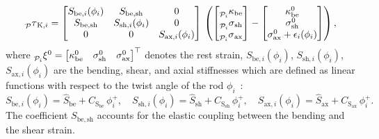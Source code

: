 \begin{equation}
    \prescript{}{\mathcal{P}}{\tau}_{\mathrm{K},i} = 
    \begin{bmatrix}
        S_{\mathrm{be},i}(\phi_i) & S_{\mathrm{be},\mathrm{sh}} & 0\\
        S_{\mathrm{be},\mathrm{sh}} & S_{\mathrm{sh},i}(\phi_i) & 0\\
        0 & 0 & S_{\mathrm{ax},i}(\phi_i)
    \end{bmatrix} 
    \, \left ( \begin{bmatrix}
        \prescript{}{\mathcal{P}_i}{\kappa}_\mathrm{be}\\ \prescript{}{\mathcal{P}_i}{\sigma}_\mathrm{sh}\\ \prescript{}{\mathcal{P}_i}{\sigma}_\mathrm{ax}
    \end{bmatrix} - \begin{bmatrix}
        \kappa_\mathrm{be}^0\\ \sigma_\mathrm{sh}^0\\ \sigma_\mathrm{ax}^0 + \epsilon_i (\phi_i)
    \end{bmatrix} \right ),
\end{equation}
where $\prescript{}{\mathcal{P}_i}{\xi}^0 = \begin{bmatrix}\kappa_\mathrm{be}^0 & \sigma_\mathrm{sh}^0 & \sigma_\mathrm{ax}^0\end{bmatrix}^\top$ denotes the rest strain,
$S_{\mathrm{be},i}(\phi_i)$, $S_{\mathrm{sh},i}(\phi_i)$, $S_{\mathrm{ax},i}(\phi_i)$ are the bending, shear, and axial stiffnesses which are defined as linear functions with respect to the twist angle of the rod $\phi_i$~\citep{good2022expanding, stolzle2023modelling}:
\begin{equation}
    S_{\mathrm{be},i}(\phi_i) = \hat{S}_{\mathrm{be}} + C_{\mathrm{S}_\mathrm{be}} \, \phi_{i}^+,
    \quad
    S_{\mathrm{sh},i}(\phi_i) = \hat{S}_{\mathrm{sh}} + C_{\mathrm{S}_\mathrm{sh}} \, \phi_{i}^+,
    \quad 
    S_{\mathrm{ax},i}(\phi_i) = \hat{S}_{\mathrm{ax}} + C_{\mathrm{S}_\mathrm{ax}} \, \phi_{i}^+.
\end{equation}
The coefficient $S_{\mathrm{be},\mathrm{sh}}$ accounts for the elastic coupling between the bending and the shear strain. 

